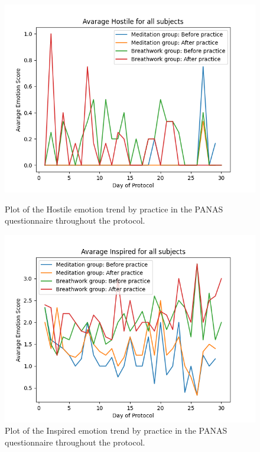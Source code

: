 \begin{figure}
    \centering
    \begin{minipage}{0.49\linewidth}
        \includegraphics[width=\linewidth]{Figures/panas/emotions/Hostile.png}
        \caption{Plot of the Hostile emotion trend by practice in the PANAS questionnaire throughout the protocol.}
        \label{fig:hostile_by_practice}
    \end{minipage}
    \hfill %
    \begin{minipage}{0.49\linewidth}
        \includegraphics[width=\linewidth]{Figures/panas/emotions/Inspired.png}
        \caption{Plot of the Inspired emotion trend by practice in the PANAS questionnaire throughout the protocol.}
        \label{fig:inspired_by_practice}
    \end{minipage}
\end{figure} %

